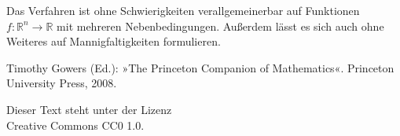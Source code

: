 \documentclass[a4paper,10pt,fleqn,twocolumn,twoside]{scrartcl}
\newcommand{\R}{\mathbb R}
\begin{document}
Das Verfahren ist ohne Schwierigkeiten verallgemeinerbar auf
Funktionen $f\colon\R^n\to\R$ mit mehreren Nebenbedingungen.
Außerdem lässt es sich auch ohne Weiteres auf Mannigfaltigkeiten
formulieren.

\begin{thebibliography}{0}
 Timothy Gowers (Ed.):
»The Princeton Companion of Mathematics«. Princeton University Press,
2008.
\end{thebibliography}

\newpage\mbox{}
\vfill\noindent
{\small Dieser Text steht unter der Lizenz\\
Creative Commons CC0 1.0.}
\end{document}
